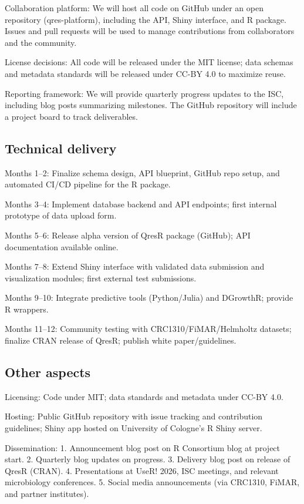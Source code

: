 \documentclass[
]{article}
\begin{document}
Collaboration platform: We will host all code on GitHub under an open
repository (qres-platform), including the API, Shiny interface, and R
package. Issues and pull requests will be used to manage contributions
from collaborators and the community.

License decisions: All code will be released under the MIT license; data
schemas and metadata standards will be released under CC-BY 4.0 to
maximize reuse.

Reporting framework: We will provide quarterly progress updates to the
ISC, including blog posts summarizing milestones. The GitHub repository
will include a project board to track deliverables.

\subsection{Technical delivery}\label{technical-delivery}

Months 1--2: Finalize schema design, API blueprint, GitHub repo setup,
and automated CI/CD pipeline for the R package.

Months 3--4: Implement database backend and API endpoints; first
internal prototype of data upload form.

Months 5--6: Release alpha version of QresR package (GitHub); API
documentation available online.

Months 7--8: Extend Shiny interface with validated data submission and
visualization modules; first external test submissions.

Months 9--10: Integrate predictive tools (Python/Julia) and DGrowthR;
provide R wrappers.

Months 11--12: Community testing with CRC1310/FiMAR/Helmholtz datasets;
finalize CRAN release of QresR; publish white paper/guidelines.

\subsection{Other aspects}\label{other-aspects}

Licensing: Code under MIT; data standards and metadata under CC-BY 4.0.

Hosting: Public GitHub repository with issue tracking and contribution
guidelines; Shiny app hosted on University of Cologne's R Shiny server.

Dissemination: 1. Announcement blog post on R Consortium blog at project
start. 2. Quarterly blog updates on progress. 3. Delivery blog post on
release of QresR (CRAN). 4. Presentations at UseR! 2026, ISC meetings,
and relevant microbiology conferences. 5. Social media announcements
(via CRC1310, FiMAR, and partner institutes).
\end{document}
